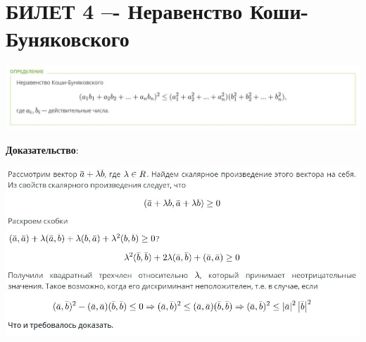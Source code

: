 \documentclass{article}
\begin{document}
\section{БИЛЕТ 4 –- Неравенство Коши-Буняковского}
\begin{center}
\includegraphics[scale=0.6]{2.jpg}
\end{center}
\textbf{Доказательство}:
\begin{center}
\includegraphics[scale=0.8]{3.jpg}
\end{center}
\newpage
\end{document}
